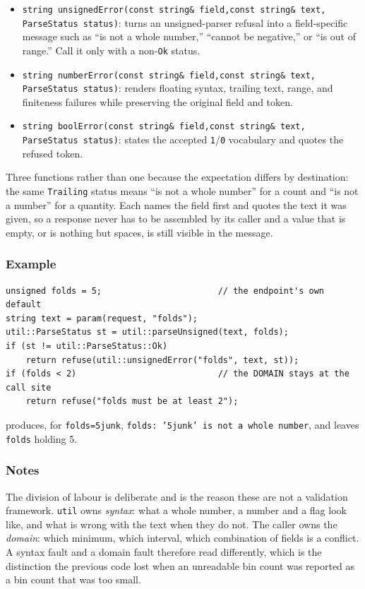 \begin{itemize}
\item \texttt{string unsignedError(const string\& field,const string\& text,
      ParseStatus status)}: turns an unsigned-parser refusal into a field-specific
      message such as ``is not a whole number,'' ``cannot be negative,'' or ``is
      out of range.''  Call it only with a non-\texttt{Ok} status.
\item \texttt{string numberError(const string\& field,const string\& text,
      ParseStatus status)}: renders floating syntax, trailing text, range, and
      finiteness failures while preserving the original field and token.
\item \texttt{string boolError(const string\& field,const string\& text,
      ParseStatus status)}: states the accepted \texttt{1}/\texttt{0} vocabulary
      and quotes the refused token.
\end{itemize}

Three functions rather than one because the expectation differs by
destination: the same \texttt{Trailing} status means ``is not a whole number''
for a count and ``is not a number'' for a quantity.  Each names the field first
and quotes the text it was given, so a response never has to be assembled by
its caller and a value that is empty, or is nothing but spaces, is still
visible in the message.

\subsubsection{Example}
\begin{verbatim}
unsigned folds = 5;                       // the endpoint's own default
string text = param(request, "folds");
util::ParseStatus st = util::parseUnsigned(text, folds);
if (st != util::ParseStatus::Ok)
    return refuse(util::unsignedError("folds", text, st));
if (folds < 2)                            // the DOMAIN stays at the call site
    return refuse("folds must be at least 2");
\end{verbatim}

\noindent produces, for \texttt{folds=5junk},
\texttt{folds: '5junk' is not a whole number}, and leaves \texttt{folds}
holding 5.

\subsubsection{Notes}
The division of labour is deliberate and is the reason these are not a
validation framework.  \texttt{util} owns \emph{syntax}: what a whole number, a
number and a flag look like, and what is wrong with the text when they do not.
The caller owns the \emph{domain}: which minimum, which interval, which
combination of fields is a conflict.  A syntax fault and a domain fault
therefore read differently, which is the distinction the previous code lost
when an unreadable bin count was reported as a bin count that was too small.

